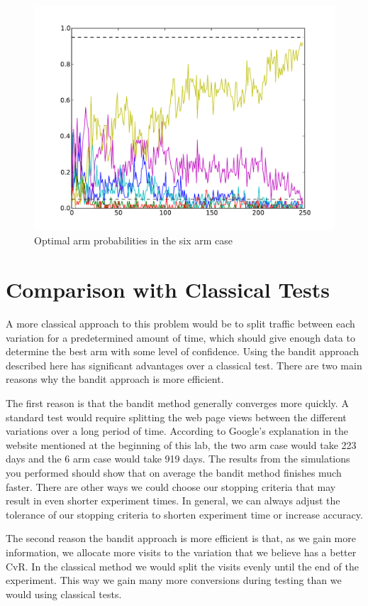 \begin{figure}\label{fig:weights2}
\begin{center}
        \includegraphics[scale=0.4]{./Applications/MarkDecProc/weights2.pdf}
        \caption{Optimal arm probabilities in the six arm case}
\end{center}
\end{figure}

\section*{Comparison with Classical Tests}
A more classical approach to this problem would be to split traffic between each variation for a predetermined amount of time, which should give enough data to determine the best arm with some level of confidence.  Using the bandit approach described here has significant advantages over a classical test.  There are two main reasons why the bandit approach is more efficient.

The first reason is that the bandit method generally converges more quickly.  A standard test would require splitting the web page views between the different variations over a long period of time.  According to Google's explanation in the website mentioned at the beginning of this lab, the two arm case would take 223 days and the 6 arm case would take 919 days.  The results from the simulations you performed should show that on average the bandit method finishes much faster.  There are other ways we could choose our stopping criteria that may result in even shorter experiment times.  In general, we can always adjust the tolerance of our stopping criteria to shorten experiment time or increase accuracy.

The second reason the bandit approach is more efficient is that, as we gain more information, we allocate more visits to the variation that we believe has a better CvR.  In the classical method we would split the visits evenly until the end of the experiment.  This way we gain many more conversions during testing than we would using classical tests.

